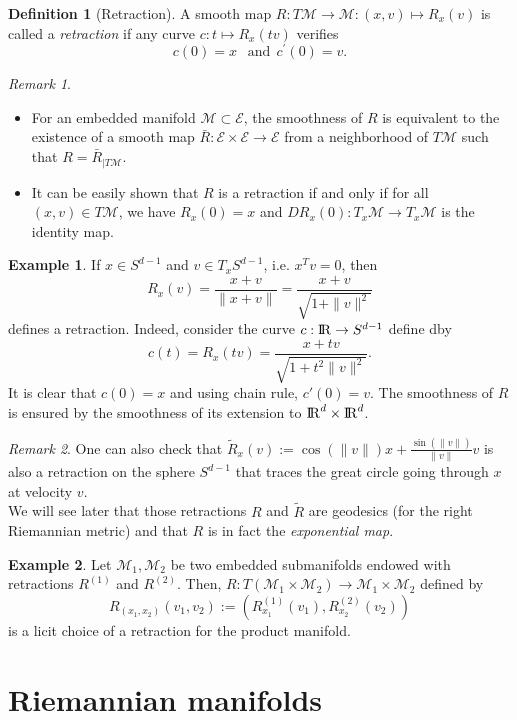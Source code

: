 \documentclass[10pt,a4paper]{book}
\theoremstyle{definition}
\newtheorem{defn}{Definition}[section]
\newtheorem{exm}{Example}[section]
\theoremstyle{plain}
\theoremstyle{remark}
\newtheorem{rmk}{Remark}[section]
\newcommand{\E}{\mathcal{E}}
\newcommand \M {\mathcal{M}}
\def\R{{\rm I\kern-0.16em R}}
\begin{document}
\begin{defn}[Retraction]
A smooth map $R:T\M \to \M: (x,v)\mapsto R_x(v)$ is called a \emph{retraction} if any curve $c:t\mapsto R_x(tv)$ verifies 
$$c(0)=x~~\text{ and}~~c^{\prime}(0)=v.$$
\end{defn}
\begin{rmk}~
\begin{itemize}
\item For an embedded manifold $\M\subset \mathcal{E}$, the smoothness of $R$ is equivalent to the existence of a smooth map $\bar{R}:\E\times \E \to \E$ from a neighborhood of $T\M$ such that $R=\bar{R}_{\mid T\M}$.
\item It can be easily shown that $R$ is a retraction if and only if for all $(x,v)\in T\M$, we have $R_x(0)=x$ and $DR_x(0):T_x\M\to T_x\M$ is the identity map.
\end{itemize}
\end{rmk}
\begin{exm}
If $x\in S^{d-1}$ and $v\in T_xS^{d-1}$, i.e. $x^{T}v=0$, then 
$$R_x(v)=\frac{x+v}{\|x+v\|}=\frac{x+v}{\sqrt{1+\|v\|^2}}$$
defines a retraction. Indeed, consider the curve $c:\R \to S^{d-1}$ define dby
$$c(t)=R_x(tv)=\frac{x+tv}{\sqrt{1+t^2\|v\|^2}}.$$
It is clear that $c(0)=x$ and using chain rule, $c'(0)=v$. The smoothness of $R$ is ensured by the smoothness of its extension to $\R^d \times \R^d$.
\end{exm}
\begin{rmk}
One can also check that $\tilde{R}_x(v):=\cos(\|v\|)x+\frac{\sin(\|v\|)}{\|v\|}v$ is also a retraction on the sphere $S^{d-1}$ that traces the great circle going through $x$ at velocity $v$. \\ We will see later that those retractions $R$ and $\tilde{R}$ are geodesics (for the right Riemannian metric) and that $R$ is in fact the \emph{exponential map}. 
\end{rmk}
\begin{exm}
Let $\M_1,\M_2$ be two embedded submanifolds endowed with retractions $R^{(1)}$ and $R^{(2)}$. Then, $R:T(\M_1\times \M_2) \to \M_1 \times \M_2$ defined by
$$R_{(x_1,x_2)}(v_1,v_2):=(R^{(1)}_{x_1}(v_1),R^{(2)}_{x_2}(v_2))$$ is a licit choice of a retraction for the product manifold.
\end{exm}
\section{Riemannian manifolds}
\end{document}
